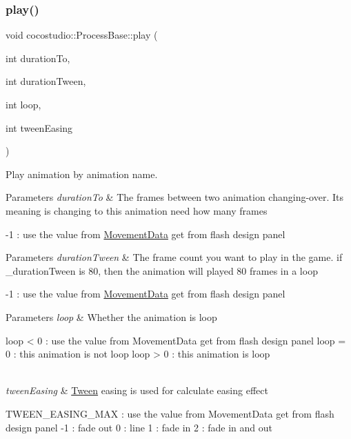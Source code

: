 \subsubsection{\texorpdfstring{play()}{play()}\hspace{0.1cm}{\footnotesize\ttfamily [1/2]}}
{\footnotesize\ttfamily void cocostudio\+::\+Process\+Base\+::play (\begin{DoxyParamCaption}\item[{int}]{duration\+To,  }\item[{int}]{duration\+Tween,  }\item[{int}]{loop,  }\item[{int}]{tween\+Easing }\end{DoxyParamCaption})\hspace{0.3cm}{\ttfamily [virtual]}}

Play animation by animation name.


\begin{DoxyParams}{Parameters}
{\em duration\+To} & The frames between two animation changing-\/over. It\textquotesingle{}s meaning is changing to this animation need how many frames\\
\hline
\end{DoxyParams}
-\/1 \+: use the value from \hyperlink{classcocostudio_1_1MovementData}{Movement\+Data} get from flash design panel 
\begin{DoxyParams}{Parameters}
{\em duration\+Tween} & The frame count you want to play in the game. if \+\_\+duration\+Tween is 80, then the animation will played 80 frames in a loop\\
\hline
\end{DoxyParams}
-\/1 \+: use the value from \hyperlink{classcocostudio_1_1MovementData}{Movement\+Data} get from flash design panel


\begin{DoxyParams}{Parameters}
{\em loop} & Whether the animation is loop \begin{DoxyVerb}    loop < 0 : use the value from MovementData get from flash design panel
    loop = 0 : this animation is not loop
    loop > 0 : this animation is loop
\end{DoxyVerb}
\\
\hline
{\em tween\+Easing} & \hyperlink{classcocostudio_1_1Tween}{Tween} easing is used for calculate easing effect \begin{DoxyVerb}    TWEEN_EASING_MAX : use the value from MovementData get from flash design panel
    -1 : fade out
    0  : line
    1  : fade in
    2  : fade in and out\end{DoxyVerb}
 \\
\hline
\end{DoxyParams}
\mbox{\label{classcocostudio_1_1ProcessBase_ab6c48b9459dc79480b97ba15b1f2da9e}} 
